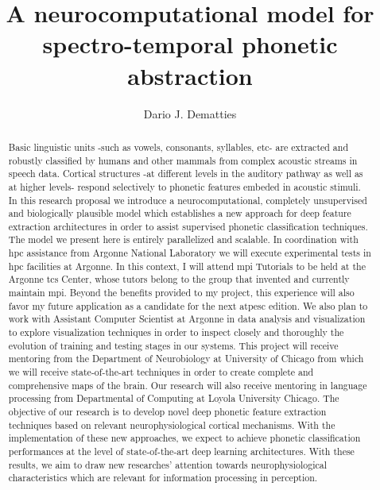 \documentclass[11pt,a4paper]{article}
\title{A neurocomputational model for spectro-temporal phonetic abstraction}
\author[1]{Dario J. Dematties}
\affil[1]{Instituto de Ingeniería Biomédica, Facultad de Ingeniería, Universidad de Buenos Aires,
Ciudad Autonoma de Buenos Aires, Buenos Aires, Argentina}
\begin{document}
\linenumbers


\maketitle

\begin{abstract}
Basic linguistic units -such as vowels, consonants, syllables, etc-
are extracted and robustly classified by humans and other mammals
from complex acoustic streams in speech data.
Cortical structures -at different levels in the auditory pathway as well as at higher levels-
respond selectively to phonetic features embeded in acoustic stimuli.
In this research proposal we introduce a neurocomputational,
completely unsupervised and biologically plausible model
which establishes a new approach for deep feature extraction
architectures in order to assist supervised phonetic classification
techniques.
The model we present here is entirely parallelized and scalable.
In coordination with \gls{hpc} assistance from Argonne National Laboratory
we will execute experimental tests in \gls{hpc} facilities at Argonne.
In this context, I will attend \gls{mpi} Tutorials to be held at
the Argonne \gls{tcs} Center, whose tutors belong to the group
that invented and currently maintain \gls{mpi}.
Beyond the benefits provided to my project,
this experience will also favor my future application as a candidate
for the next \gls{atpesc} edition. 
We also plan to work with Assistant Computer Scientist at Argonne
in data analysis and visualization to explore visualization techniques
in order to inspect closely and thoroughly the evolution of
training and testing stages
in our systems.
This project will receive mentoring from the Department of Neurobiology at
University of Chicago from which we will receive state-of-the-art
techniques in order to create complete and comprehensive maps of the brain.
Our research will also receive mentoring in language processing
from Departmental of Computing at
Loyola University Chicago.
The objective of our research is to develop novel deep phonetic
feature extraction techniques based on relevant neurophysiological
cortical mechanisms.
With the implementation of these new approaches, we expect to
achieve phonetic classification performances at the level of state-of-the-art deep learning architectures. 
With these results, we aim to draw new researches' attention 
towards neurophysiological characteristics which are
relevant for information processing in perception.
\end{abstract}
\end{document}
